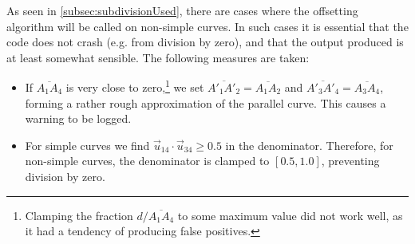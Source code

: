 \documentclass[12pt,a4paper]{article}
\theoremstyle{definition}
\newcommand{\uv}{\vec{u}}
\begin{document}
As seen in \cref{subsec:subdivisionUsed}, there are cases where the offsetting algorithm will be called on non-simple curves. In such cases it is essential that the code does not crash (e.g. from division by zero), and that the output produced is at least somewhat sensible. The following measures are taken:
\begin{itemize}
  \item If $\overline{A_1A_4}$ is very close to zero,\footnote{Clamping the fraction $d/\overline{A_1A_4}$ to some maximum value did not work well, as it had a tendency of producing false positives.} we set $\overline{A'_1A'_2} = \overline{A_1A_2}$ and $\overline{A'_3A'_4} = \overline{A_3A_4}$, forming a rather rough approximation of the parallel curve. This causes a warning to be logged.
  \item For simple curves we find $\uv_{14}\cdot\uv_{34} \geq 0.5$ in the denominator. Therefore, for non-simple curves, the denominator is clamped to $[0.5, 1.0]$, preventing division by zero.
\end{itemize}
\end{document}

